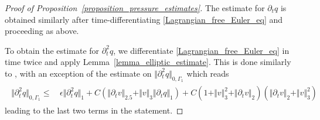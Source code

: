 \documentclass[10pt,reqno]{amsart}
\theoremstyle{plain}
\theoremstyle{definition}
\numberwithin{equation}{section}
\newcommand{\al}{\alpha}
\newcommand{\Ga}{\Gamma}
\newcommand{\si}{\sigma}
\newcommand{\norm}[1]{\Vert#1\Vert}
\begin{document}
\begin{proof}[Proof of Proposition~\ref{proposition_pressure_estimates}]
The estimate for $\partial_t q$ is obtained similarly after time-differentiating \eqref{Lagrangian_free_Euler_eq}
and proceeding as above.

To obtain the estimate for $\partial_t^2 q$, we differentiate \eqref{Lagrangian_free_Euler_eq} in time
twice and
apply Lemma~\ref{lemma_elliptic_estimate}. This is 
done similarly to \cite{IgorMihaelaSurfaceTension},
with an exception of the estimate on 
$\norm{\partial_{t}^2q}_{0,\Ga_1}$ which reads
\begin{align}
\begin{split}
\norm{\partial^2_t q}_{0,\Ga_1}  \leq & \, \epsilon \norm{\partial^2_t q}_1 + 
C (\norm{\partial_t v}_{2.5} + \norm{v}_3 \norm{\partial_t q}_1 )
+ C(1+\norm{v}^2_3 + \norm{\partial_t v}_2)(\norm{\partial_t v}_2 + \norm{v}_3^2 )
\end{split}
   \label{EQ05}
\end{align}
leading to the last two terms in the statement.

\end{proof}
\end{document}
